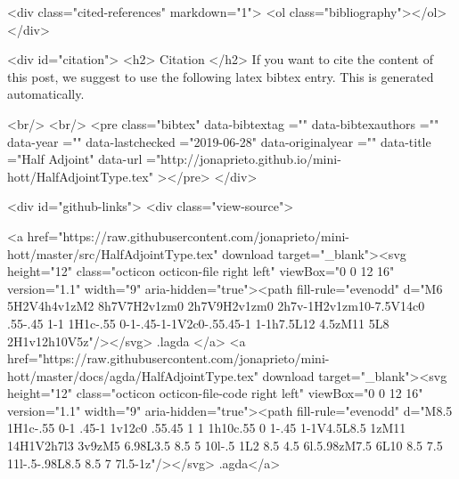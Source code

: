   <div class="cited-references" markdown="1">
  <ol class="bibliography"></ol>
  </div>


  
  <div id="citation">
  <h2> Citation </h2>
  If you want to cite the content of this post,
  we suggest to use the following latex bibtex entry.
  This is generated automatically.

  <br/>
  <br/>
  <pre class="bibtex"
       data-bibtextag =""
       data-bibtexauthors =""
       data-year =""
       data-lastchecked ="2019-06-28"
       data-originalyear =""
       data-title ="Half Adjoint"
       data-url ="http://jonaprieto.github.io/mini-hott/HalfAdjointType.tex"
  ></pre>
  </div>
  

  <div id="github-links">
    <div class="view-source">
      
        <a href="https://raw.githubusercontent.com/jonaprieto/mini-hott/master/src/HalfAdjointType.tex" download target="_blank"><svg height="12" class="octicon octicon-file right left" viewBox="0 0 12 16" version="1.1" width="9" aria-hidden="true"><path fill-rule="evenodd" d="M6 5H2V4h4v1zM2 8h7V7H2v1zm0 2h7V9H2v1zm0 2h7v-1H2v1zm10-7.5V14c0 .55-.45 1-1 1H1c-.55 0-1-.45-1-1V2c0-.55.45-1 1-1h7.5L12 4.5zM11 5L8 2H1v12h10V5z"/></svg> .lagda </a>
        <a href="https://raw.githubusercontent.com/jonaprieto/mini-hott/master/docs/agda/HalfAdjointType.tex" download target="_blank"><svg height="12" class="octicon octicon-file-code right left" viewBox="0 0 12 16" version="1.1" width="9" aria-hidden="true"><path fill-rule="evenodd" d="M8.5 1H1c-.55 0-1 .45-1 1v12c0 .55.45 1 1 1h10c.55 0 1-.45 1-1V4.5L8.5 1zM11 14H1V2h7l3 3v9zM5 6.98L3.5 8.5 5 10l-.5 1L2 8.5 4.5 6l.5.98zM7.5 6L10 8.5 7.5 11l-.5-.98L8.5 8.5 7 7l.5-1z"/></svg> .agda</a>
      
